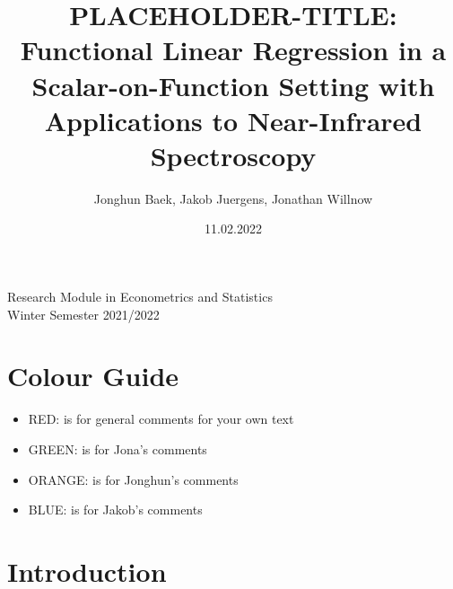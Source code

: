 \documentclass[11pt,twoside,a4paper]{article}
\begin{document}
	\title{{\LARGE {\color{red}PLACEHOLDER-TITLE:} Functional Linear Regression in a Scalar-on-Function Setting with Applications to Near-Infrared Spectroscopy}}
	\author{Jonghun Baek, Jakob Juergens, Jonathan Willnow}
	\date{11.02.2022}
	\maketitle
	\vspace{1.5 cm}
	\begin{center}
		Research Module in Econometrics and Statistics \\
		Winter Semester 2021/2022
	\end{center}
	
	\newpage
	
	\tableofcontents
	
	\newpage
	
	\section{Colour Guide}
		\begin{itemize}
			\item {\color{red} RED}: is for general comments for your own text
			\item {\color{green} GREEN}: is for Jona's comments
			\item {\color{orange} ORANGE}: is for Jonghun's comments
			\item {\color{blue} BLUE}: is for Jakob's comments
		\end{itemize}
	
	\section{Introduction}
	
\end{document}
